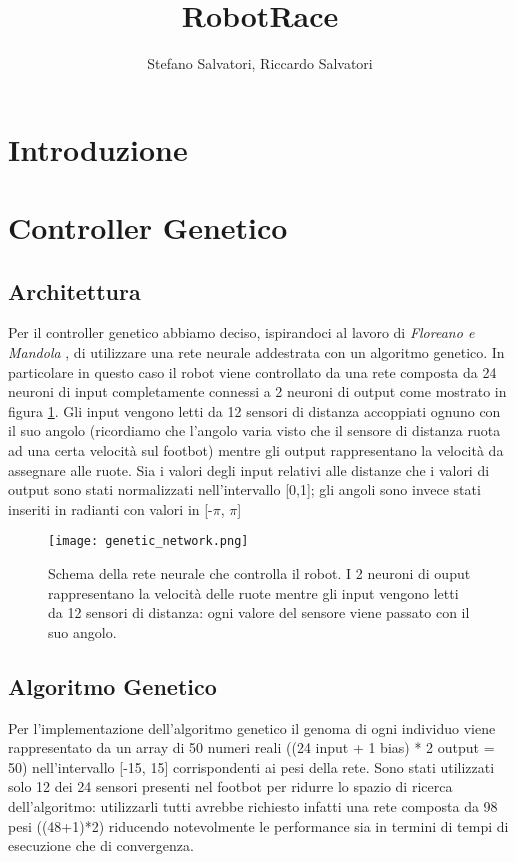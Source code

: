 \documentclass[]{report}
\title{RobotRace}
\author{Stefano Salvatori, Riccardo Salvatori}
\begin{document}
\maketitle

\section{Introduzione}


\section{Controller Genetico}
\subsection{Architettura}
Per il controller genetico abbiamo deciso, ispirandoci al lavoro di \textit{Floreano e Mandola} \cite{genetic_evolution_nn},  di utilizzare una rete neurale addestrata con un algoritmo genetico. In particolare in questo caso il robot viene controllato da una rete composta da 24 neuroni di input completamente connessi a 2 neuroni di output come mostrato in figura \ref{fig:genetic_network}.
Gli input vengono letti da 12 sensori di distanza accoppiati ognuno con il suo angolo (ricordiamo che l'angolo varia visto che il sensore di distanza ruota ad una certa velocità sul footbot) mentre gli output rappresentano la velocità da assegnare alle ruote. Sia i valori degli input relativi alle distanze che i valori di output sono stati normalizzati nell'intervallo [0,1]; gli angoli sono invece stati inseriti in radianti con valori in [-$\pi$, $\pi$]
\begin{figure}[h]
\centering
\texttt{[image: genetic\_network.png]}
\caption{Schema della rete neurale che controlla il robot. I 2 neuroni di ouput rappresentano la velocità delle ruote mentre gli input vengono letti da 12 sensori di distanza: ogni valore del sensore viene passato con il suo angolo. }
\label{fig:genetic_network}
\end{figure}

\subsection{Algoritmo Genetico}
Per l'implementazione dell'algoritmo genetico il genoma di ogni individuo viene rappresentato da un array di 50 numeri reali ((24 input + 1 bias) * 2  output = 50) nell'intervallo [-15, 15] corrispondenti ai pesi della rete. Sono stati utilizzati solo 12 dei 24 sensori presenti nel footbot per ridurre lo spazio di ricerca dell'algoritmo: utilizzarli tutti avrebbe richiesto infatti una rete composta da 98 pesi ((48+1)*2) riducendo notevolmente le performance sia in termini di tempi di esecuzione che di convergenza.
\end{document}
